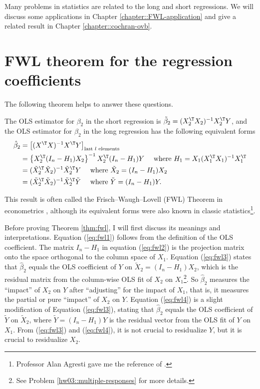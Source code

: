 Many problems in statistics are related to the long and short regressions. We will discuss some applications in Chapter \ref{chapter::FWL-application} and give a related result in Chapter \ref{chapter::cochran-ovb}. 

 

\section{FWL theorem for the regression coefficients}

The following theorem helps to answer these questions. 
\begin{theorem}
\label{thm:fwl}The OLS estimator for $\beta_2$ in the short regression is $\tilde{\beta}_{2}=(X_{2}^{\T}X_{2})^{-1}X_{2}^{\T}Y$, and the OLS estimator for $\beta_{2}$ in the long regression has
the following equivalent forms
\begin{align}
\hat{\beta}_{2} & =\left[(X^{\T}X)^{-1}X^{\T}Y\right]_{\textup{last }l\textup{ elements}}\label{eq:fwl1}\\
 & =\left\{ X_{2}^{\T}(I_{n}-H_{1})X_{2}\right\} ^{-1}X_{2}^{\T}(I_{n}-H_{1})Y\quad\text{ where }H_{1}=X_{1}(X_{1}^{\T}X_{1})^{-1}X_{1}^{\T}  \label{eq:fwl2}\\
 & =(\tilde{X}_{2}^{\T}\tilde{X}_{2})^{-1}\tilde{X}_{2}^{\T}Y\quad\text{ where }\tilde{X}_{2}=(I_{n}-H_{1})X_{2}\label{eq:fwl3}\\
 & =(\tilde{X}_{2}^{\T}\tilde{X}_{2})^{-1}\tilde{X}_{2}^{\T}\tilde{Y}\quad\text{ where }\tilde{Y}=(I_{n}-H_{1})Y.\label{eq:fwl4}
\end{align}
\end{theorem}


This result is often called the  Frisch--Waugh--Lovell (FWL) Theorem in econometrics \citep{frisch1933partial, lovell1963seasonal}, although its equivalent forms were also known in classic statistics\footnote{Professor Alan Agresti gave me the reference of \citet{yule1907theory}.}. 

Before proving Theorem \ref{thm:fwl}, I will first discuss its meanings
and interpretations. Equation (\ref{eq:fwl1}) follows from the definition
of the OLS coefficient. The matrix $I_{n}-H_{1}$ in equation (\ref{eq:fwl2})
is the projection matrix onto the space orthogonal to the column
space of $X_{1}$. Equation (\ref{eq:fwl3}) states that $\hat{\beta}_{2}$
equals the OLS coefficient of $Y$ on $\tilde{X}_{2}=(I_{n}-H_{1})X_{2}$,
which is the residual matrix from the column-wise OLS fit of $X_{2}$
on $X_{1}$\footnote{See Problem \ref{hw03::multiple-responses} for more details. }. So $\hat{\beta}_{2}$ measures the ``impact'' of $X_{2}$
on $Y$ after ``adjusting'' for the impact of $X_{1}$, that is, it
measures the partial or pure ``impact'' of $X_{2}$ on $Y$. Equation
(\ref{eq:fwl4}) is a slight modification of Equation (\ref{eq:fwl3}),
stating that $\hat{\beta}_{2}$ equals the OLS coefficient of $\tilde{Y}$
on $\tilde{X}_{2}$, where $\tilde{Y}=(I_{n}-H_{1})Y$ is the residual
vector from the OLS fit of $Y$ on $X_{1}$. From (\ref{eq:fwl3}) and
(\ref{eq:fwl4}), it is not crucial to residualize $Y$, but
it is crucial to residualize $X_{2}$. 

